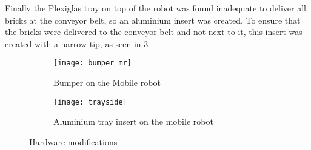 Finally the Plexiglas tray on top of the robot was found inadequate to deliver all bricks at the conveyor belt, so an aluminium insert was created. To ensure that the bricks were delivered to the conveyor belt and not next to it, this insert was created with a narrow tip, as seen in \ref{fig:tray}

  	\begin{figure}[H]
    \centering
        \begin{subfigure}{0.48\textwidth}
			\texttt{[image: bumper\_mr]}
			\caption{Bumper on the Mobile robot}
			\label{fig:bumper}
        \end{subfigure}
        \hspace{10pt}
        \begin{subfigure}{0.48\textwidth}
			\texttt{[image: trayside]}
			\caption{Aluminium tray insert on the mobile robot}
			\label{fig:tray}
   		\end{subfigure}
    \caption{Hardware modifications}
    \end{figure}

